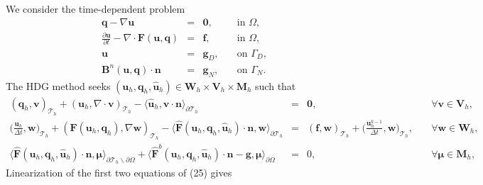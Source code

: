 \documentclass[11pt]{article}
\begin{document}
We consider the time-dependent problem
\begin{equation}
\begin{array}{rcll}
\bm{q} - \nabla \bm{u}  & = & \bm{0} , & \quad \mbox{in } \Omega, \\
\displaystyle \frac{\partial \bm{u}}{\partial t}  - \nabla \cdot \bm{F} (\bm{u},\bm{q}) & = & \bm{f}, & \quad \mbox{in } \Omega, \\
\bm{u} & = & \bm{g}_D, & \quad \mbox{on } \Gamma_D , \\
\bm{B}^n(\bm{u},\bm{q}) \cdot \bm{n} & = & \bm{g}_N, & \quad \mbox{on } \Gamma_N .
\end{array}
\end{equation}
The HDG method seeks $(\bm{u}_h,\bm{q}_h,\widehat{\bm{u}}_h) \in \bm{W}_h \times \bm{V}_h \times \bm{M}_h$ such that
\begin{equation}
\begin{array}{rcll}
(\bm{q}_h, \bm{v})_{\mathcal{T}_h} + (\bm{u}_h, \nabla \cdot \bm{v})_{\mathcal{T}_h} - \langle \widehat{\bm{u}}_h, \bm{v} \cdot \bm{n} \rangle_{\partial \mathcal{T}_h}  & = & \bm{0}, & \quad \forall \bm{v} \in \bm{V}_h, \\[2ex] 
\displaystyle \Big(\frac{\bm{u}_h}{\Delta t}, \bm{w} \Big)_{\mathcal{T}_h} + (\bm{F} (\bm{u}_h,\bm{q}_h), \nabla \bm{w})_{\mathcal{T}_h} - \langle \widehat{\bm{F}} (\bm{u}_h, \bm{q}_h,\widehat{\bm{u}}_h) \cdot \bm{n}, \bm{w} \rangle_{\partial \mathcal{T}_h} & = & (\bm{f}, \bm{w})_{\mathcal{T}_h} + \displaystyle \Big(\frac{\bm{u}_h^{k-1}}{\Delta t}, \bm{w} \Big)_{\mathcal{T}_h}, & \quad \forall \bm{w} \in \bm{W}_h, \\[2ex]
\langle \widehat{\bm{F}} (\bm{u}_h,\bm{q}_h, \widehat{\bm{u}}_h) \cdot \bm{n}, \bm{\mu} \rangle_{\partial \mathcal{T}_h \backslash \partial \Omega} + \langle \widehat{\bm{F}}^b(\bm{u}_h, \bm{q}_h, \widehat{\bm{u}}_h) \cdot \bm{n} - \bm{g}, \bm{\mu} \rangle_{\partial \Omega}  & = & 0, & \quad \forall \bm{\mu} \in \bm{M}_h ,
\end{array}
\end{equation}
Linearization of the first two equations of (25) gives
\end{document}

